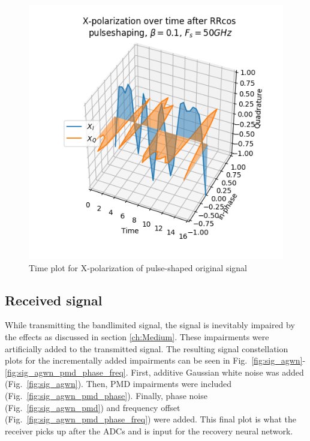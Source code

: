\documentclass[journal,10pt,twoside, a4paper]{IEEEtran}
\begin{document}
\begin{figure}
    \centering
    \includegraphics[width=\linewidth]{Thesis/images/sig_shaped_time}
    \caption{Time plot for X-polarization of pulse-shaped original signal}
    \label{fig:sig_shaped_time}
\end{figure}

\subsection{Received signal}
While transmitting the bandlimited signal, the signal is inevitably impaired by the effects as discussed in section \ref{ch:Medium}. These impairments were artificially added to the transmitted signal. The resulting signal constellation plots for the incrementally added impairments can be seen in Fig.~\ref{fig:sig_agwn}-\ref{fig:sig_agwn_pmd_phase_freq}. First, additive Gaussian white noise was added (Fig.~\ref{fig:sig_agwn}). Then, PMD impairments were included (Fig.~\ref{fig:sig_agwn_pmd_phase}). Finally, phase noise (Fig.~\ref{fig:sig_agwn_pmd}) and frequency offset (Fig.~\ref{fig:sig_agwn_pmd_phase_freq}) were added. This final plot is what the receiver picks up after the ADCs and is input for the recovery neural network.
\end{document}

